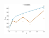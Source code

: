 \documentclass[a4paper]{report}
\newcommand{\wratio}{0.16}
\begin{document}
\vfill
\includegraphics[width=\wratio\textwidth]{maxcut/TWITTER/fs_twitter}\hfill
\clearpage
\end{document}
